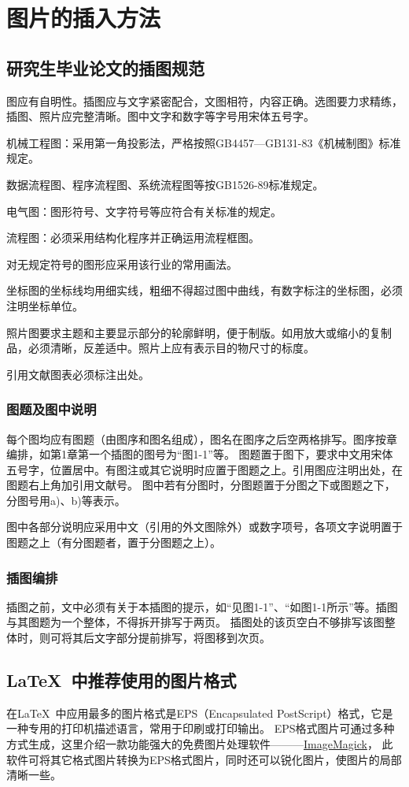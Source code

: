 \chapter{图片的插入方法}
\section{研究生毕业论文的插图规范}
图应有自明性。插图应与文字紧密配合，文图相符，内容正确。选图要力求精练，插图、照片应完整清晰。图中文字和数字等字号用宋体五号字。

机械工程图：采用第一角投影法，严格按照GB4457---GB131-83《机械制图》标准规定。

数据流程图、程序流程图、系统流程图等按GB1526-89标准规定。

电气图：图形符号、文字符号等应符合有关标准的规定。

流程图：必须采用结构化程序并正确运用流程框图。

对无规定符号的图形应采用该行业的常用画法。

坐标图的坐标线均用细实线，粗细不得超过图中曲线，有数字标注的坐标图，必须注明坐标单位。

照片图要求主题和主要显示部分的轮廓鲜明，便于制版。如用放大或缩小的复制品，必须清晰，反差适中。照片上应有表示目的物尺寸的标度。

引用文献图表必须标注出处。

\subsection{图题及图中说明}
每个图均应有图题（由图序和图名组成），图名在图序之后空两格排写。图序按章编排，如第1章第一个插图的图号为“图1-1”等。
图题置于图下，要求中文用宋体五号字，位置居中。有图注或其它说明时应置于图题之上。引用图应注明出处，在图题右上角加引用文献号。
图中若有分图时，分图题置于分图之下或图题之下，分图号用a)、b)等表示。

图中各部分说明应采用中文（引用的外文图除外）或数字项号，各项文字说明置于图题之上（有分图题者，置于分图题之上）。

\subsection{插图编排}
插图之前，文中必须有关于本插图的提示，如“见图1-1”、“如图1-1所示”等。插图与其图题为一个整体，不得拆开排写于两页。
插图处的该页空白不够排写该图整体时，则可将其后文字部分提前排写，将图移到次页。

\section{\LaTeX~中推荐使用的图片格式}
在\LaTeX~中应用最多的图片格式是EPS（Encapsulated PostScript）格式，它是一种专用的打印机描述语言，常用于印刷或打印输出。
EPS格式图片可通过多种方式生成，这里介绍一款功能强大的免费图片处理软件———\href{http://www.imagemagick.org/}{ImageMagick}，
此软件可将其它格式图片转换为EPS格式图片，同时还可以锐化图片，使图片的局部清晰一些。

